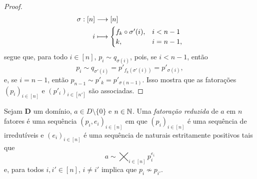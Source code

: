 \begin{proof}
	\begin{align*}
	{\sigma}: {[n]} &\longrightarrow {[n]} \\{i} &\longmapsto {\begin{cases}
		f_k \circ \sigma'(i), & i < n-1 \\
		k, & i = n-1,
		\end{cases}}
	\end{align*}
segue que, para todo $i \in [n]$, $p_i \sim q_{\sigma(i)}$, pois, se $i<n-1$, então
	\begin{equation*}
	p_i \sim q_{\sigma'(i)} = p'_{f_k(\sigma'(i))} = p'_{\sigma(i)},
	\end{equation*}
e, se $i = n-1$, então $p_{n-1} \sim p'_k = p'_{\sigma(n-1)}$. Isso mostra que as fatorações $(p_i)_{i \in [n]}$ e $(p'_i)_{i \in [n']}$ são associadas.
\end{proof}

\begin{defi}
Sejam $\bm D$ um domínio, $a \in D \setminus \{0\}$ e $n \in \mathbb{N}$. Uma \emph{fatoração reduzida} de $a$ em $n$ fatores é uma sequência $(p_i,e_i)_{i \in [n]}$ em que $(p_i)_{i \in [n]}$ é uma sequência de irredutíveis e $(e_i)_{i \in [n]}$ é uma sequência de naturais estritamente positivos tais que
	\begin{equation*}
	a \sim \bigtimes_{i \in [n]} p_i^{e_i}
	\end{equation*}
e, para todos $i,i' \in [n]$, $i \neq i'$ implica que $p_i \not\sim p_{i'}$.
\end{defi}


